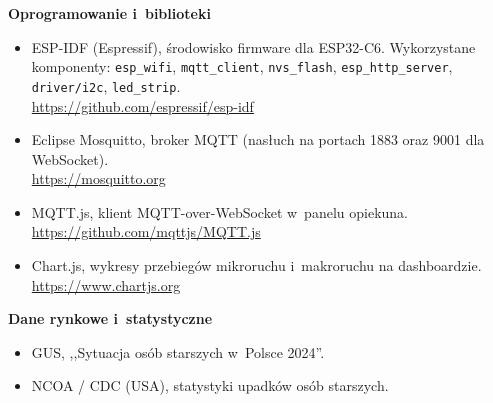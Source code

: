 \documentclass[11pt,a4paper]{article}
\begin{document}
\medskip
\noindent\textbf{Oprogramowanie i~biblioteki}
\begin{itemize}[leftmargin=1.4em]
  \item ESP-IDF (Espressif), \'srodowisko firmware dla ESP32-C6. Wykorzystane
        komponenty: \texttt{esp\_wifi}, \texttt{mqtt\_client}, \texttt{nvs\_flash},
        \texttt{esp\_http\_server}, \texttt{driver/i2c}, \texttt{led\_strip}.\\
        \url{https://github.com/espressif/esp-idf}
  \item Eclipse Mosquitto, broker MQTT (nas\l uch na portach 1883 oraz 9001 dla
        WebSocket).\\ \url{https://mosquitto.org}
  \item MQTT.js, klient MQTT-over-WebSocket w~panelu opiekuna.\\
        \url{https://github.com/mqttjs/MQTT.js}
  \item Chart.js, wykresy przebieg\'ow mikroruchu i~makroruchu na dashboardzie.\\
        \url{https://www.chartjs.org}
\end{itemize}

\medskip
\noindent\textbf{Dane rynkowe i~statystyczne}
\begin{itemize}[leftmargin=1.4em]
  \item GUS, ,,Sytuacja os\'ob starszych w~Polsce 2024''.
  \item NCOA / CDC (USA), statystyki upadk\'ow os\'ob starszych.
\end{itemize}
\end{document}
